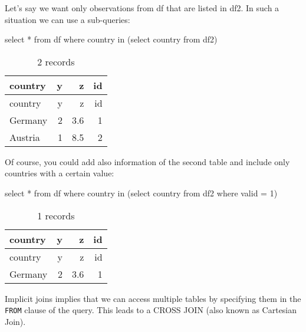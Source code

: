 \documentclass[
  letterpaper,
  DIV=11,
  numbers=noendperiod]{scrreprt}
\newenvironment{Shaded}{\begin{snugshade}}{\end{snugshade}}
\newcommand{\DecValTok}[1]{\textcolor[rgb]{0.68,0.00,0.00}{#1}}
\newcommand{\KeywordTok}[1]{\textcolor[rgb]{0.00,0.23,0.31}{#1}}
\newcommand{\NormalTok}[1]{\textcolor[rgb]{0.00,0.23,0.31}{#1}}
\newcommand{\OperatorTok}[1]{\textcolor[rgb]{0.37,0.37,0.37}{#1}}
\begin{document}
Let's say we want only observations from df that are listed in df2. In
such a situation we can use a sub-queries:

\begin{Shaded}
\begin{Highlighting}[]
\KeywordTok{select} \OperatorTok{*} \KeywordTok{from}\NormalTok{ df}
  \KeywordTok{where}\NormalTok{ country }\KeywordTok{in}
\NormalTok{  (}\KeywordTok{select}\NormalTok{ country }\KeywordTok{from}\NormalTok{ df2)}
\end{Highlighting}
\end{Shaded}

\begin{longtable}[]{@{}lrrr@{}}
\caption{2 records}\tabularnewline
\toprule()
country & y & z & id \\
\midrule()
\endfirsthead
\toprule()
country & y & z & id \\
\midrule()
\endhead
Germany & 2 & 3.6 & 1 \\
Austria & 1 & 8.5 & 2 \\
\bottomrule()
\end{longtable}

Of course, you could add also information of the second table and
include only countries with a certain value:

\begin{Shaded}
\begin{Highlighting}[]
\KeywordTok{select} \OperatorTok{*} \KeywordTok{from}\NormalTok{ df}
  \KeywordTok{where}\NormalTok{ country }\KeywordTok{in}
\NormalTok{  (}\KeywordTok{select}\NormalTok{ country }\KeywordTok{from}\NormalTok{ df2 }\KeywordTok{where}\NormalTok{ valid }\OperatorTok{=} \DecValTok{1}\NormalTok{)}
\end{Highlighting}
\end{Shaded}

\begin{longtable}[]{@{}lrrr@{}}
\caption{1 records}\tabularnewline
\toprule()
country & y & z & id \\
\midrule()
\endfirsthead
\toprule()
country & y & z & id \\
\midrule()
\endhead
Germany & 2 & 3.6 & 1 \\
\bottomrule()
\end{longtable}

Implicit joins implies that we can access multiple tables by specifying
them in the \texttt{FROM} clause of the query. This leads to a CROSS
JOIN (also known as Cartesian Join).
\end{document}

